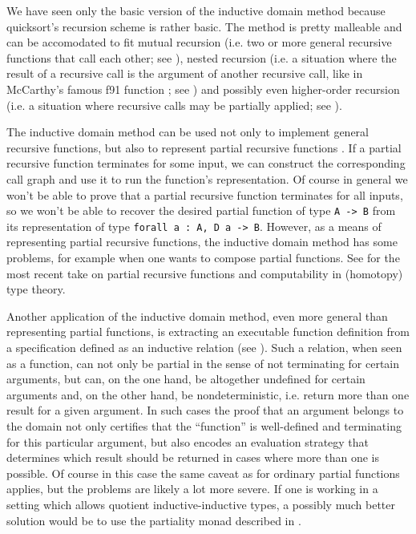 \documentclass[declaration,mgr,english,shortabstract]{iithesis}
\newcommand{\m}[1]{\texttt{#1}}
\begin{document}
We have seen only the basic version of the inductive domain method because quicksort's recursion scheme is rather basic. The method is pretty malleable and can be accomodated to fit mutual recursion (i.e. two or more general recursive functions that call each other; see \cite{BCM3}), nested recursion (i.e. a situation where the result of a recursive call is the argument of another recursive call, like in McCarthy's famous f91 function \cite{f91}; see \cite{BCM2}) and possibly even higher-order recursion (i.e. a situation where recursive calls may be partially applied; see \cite{BCM6}).

The inductive domain method can be used not only to implement general recursive functions, but also to represent partial recursive functions \cite{BCM8}. If a partial recursive function terminates for some input, we can construct the corresponding call graph and use it to run the function's representation. Of course in general we won't be able to prove that a partial recursive function terminates for all inputs, so we won't be able to recover the desired partial function of type \m{A -> B} from its representation of type \m{forall a\ :\ A, D a -> B}. However, as a means of representing partial recursive functions, the inductive domain method has some problems, for example when one wants to compose partial functions. See \cite{Knapp} for the most recent take on partial recursive functions and computability in (homotopy) type theory.

Another application of the inductive domain method, even more general than representing partial functions, is extracting an executable function definition from a specification defined as an inductive relation (see \cite{Function}). Such a relation, when seen as a function, can not only be partial in the sense of not terminating for certain arguments, but can, on the one hand, be altogether undefined for certain arguments and, on the other hand, be nondeterministic, i.e. return more than one result for a given argument. In such cases the proof that an argument belongs to the domain not only certifies that the ``function'' is well-defined and terminating for this particular argument, but also encodes an evaluation strategy that determines which result should be returned in cases where more than one is possible. Of course in this case the same caveat as for ordinary partial functions applies, but the problems are likely a lot more severe. If one is working in a setting which allows quotient inductive-inductive types, a possibly much better solution would be to use the partiality monad described in \cite{PartialityMonad}.
\end{document}
